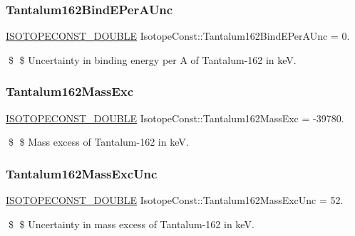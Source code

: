 \subsubsection{\texorpdfstring{Tantalum162\+Bind\+E\+Per\+A\+Unc}{Tantalum162BindEPerAUnc}}
{\footnotesize\ttfamily \mbox{\hyperlink{group___isotope_const-_macros_ga8f45a7272ce02c0b4c65c44636ed719a}{I\+S\+O\+T\+O\+P\+E\+C\+O\+N\+S\+T\+\_\+\+D\+O\+U\+B\+LE}} Isotope\+Const\+::\+Tantalum162\+Bind\+E\+Per\+A\+Unc = 0.}

\$ \$ Uncertainty in binding energy per A of Tantalum-\/162 in keV. \mbox{\label{group___isotope_const-_tantalum-_ta162_ga35b7a92e709924ebae56546120786e53}} 
\subsubsection{\texorpdfstring{Tantalum162\+Mass\+Exc}{Tantalum162MassExc}}
{\footnotesize\ttfamily \mbox{\hyperlink{group___isotope_const-_macros_ga8f45a7272ce02c0b4c65c44636ed719a}{I\+S\+O\+T\+O\+P\+E\+C\+O\+N\+S\+T\+\_\+\+D\+O\+U\+B\+LE}} Isotope\+Const\+::\+Tantalum162\+Mass\+Exc = -\/39780.}

\$ \$ Mass excess of Tantalum-\/162 in keV. \mbox{\label{group___isotope_const-_tantalum-_ta162_ga8f0affbfbdec256dd7051b49ff217356}} 
\subsubsection{\texorpdfstring{Tantalum162\+Mass\+Exc\+Unc}{Tantalum162MassExcUnc}}
{\footnotesize\ttfamily \mbox{\hyperlink{group___isotope_const-_macros_ga8f45a7272ce02c0b4c65c44636ed719a}{I\+S\+O\+T\+O\+P\+E\+C\+O\+N\+S\+T\+\_\+\+D\+O\+U\+B\+LE}} Isotope\+Const\+::\+Tantalum162\+Mass\+Exc\+Unc = 52.}

\$ \$ Uncertainty in mass excess of Tantalum-\/162 in keV. \mbox{\label{group___isotope_const-_tantalum-_ta162_ga46d53a501f836db1c043321bb2f5a10c}} 

